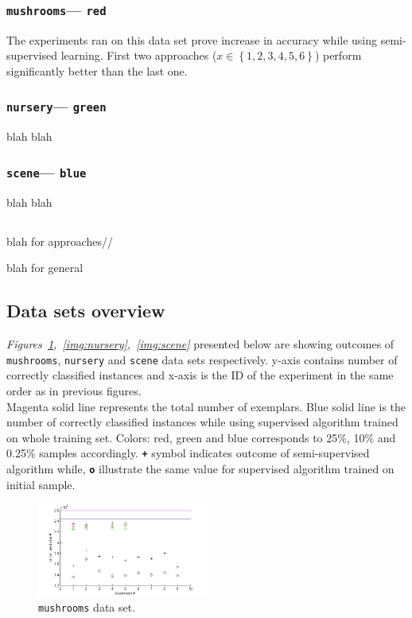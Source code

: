 \documentclass[12pt, a4paper, pdflatex]{report}
\begin{document}
\subsubsection{\texttt{mushrooms}--- \texttt{red}}
The experiments ran on this data set prove increase in accuracy while using semi-supervised learning. First two approaches ($x \in \left \{ 1, 2, 3 ,4, 5, 6 \right \}$) perform significantly better than the last one.

\subsubsection{\texttt{nursery}--- \texttt{green}}
blah blah

\subsubsection{\texttt{scene}--- \texttt{blue}}
blah blah

\subsection*{}
blah for approaches//

blah for general



\subsection{Data sets overview}
\emph{Figures~\ref{img:mushrooms},~\ref{img:nursery},~\ref{img:scene}} presented below are showing outcomes of \texttt{mushrooms}, \texttt{nursery} and \texttt{scene} data sets respectively. y-axis contains number of correctly classified instances and x-axis is the ID of the experiment in the same order as in previous figures.\\
Magenta solid line represents the total number of exemplars. Blue solid line is the number of correctly classified instances while using supervised algorithm trained on whole training set. Colors: red, green and blue corresponds to 25\%, 10\% and 0.25\% samples accordingly. \texttt{\textbf{+}} symbol indicates outcome of semi-supervised algorithm while, \texttt{\textbf{o}} illustrate the same value for supervised algorithm trained on initial sample.

\begin{figure}[htbp]
	\centering
	\includegraphics[width=0.5\textwidth]{graphics/figures/fig1.jpg}
	\begin{tiny}
		\caption{\small \texttt{mushrooms} data set.\label{img:mushrooms}}
	\end{tiny}
\end{figure}
\end{document}
